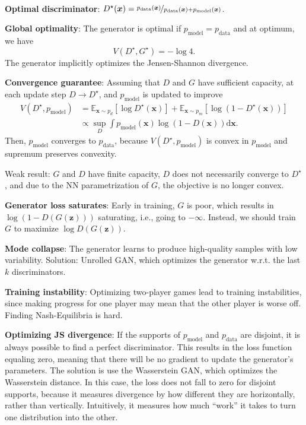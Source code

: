\documentclass{article}
\newcommand{\E}{\mathbb{E}}
\renewcommand{\vec}[1]{\bm{#1}}
\newenvironment{topic}[1]
{\textbf{\sffamily \colorbox{black}{\rlap{\textbf{\textcolor{white}{#1}}}\hspace{\linewidth}\hspace{-2\fboxsep}}} \\ \vspace{0.2cm}}
{}
\begin{document}
\begin{multicols*}{2}
\begin{topic}{Generative adversarial network}
        \textbf{Optimal discriminator}: $D^\star(\vec{x}) = \nicefrac{p_{\mathrm{data}}(\vec{x})}{p_{\mathrm{data}}(\vec{x}) + p_{\mathrm{model}}(\vec{x})}$.

        \textbf{Global optimality}: The generator is optimal if $p_{\mathrm{model}} = p_{\mathrm{data}}$ and at optimum, we have \[
            V(D^\star, G^\star) = -\log 4.
        \]
        The generator implicitly optimizes the Jensen-Shannon divergence.

        \textbf{Convergence guarantee}: Assuming that $D$ and $G$ have sufficient capacity, at each update step $D \to D^\star$, and $p_{\mathrm{model}}$ is updated to improve
        \begin{align*}
            V(D^\star, p_{\mathrm{model}}) & = \E_{\vec{x} \sim p_d} [\log D^\star(\vec{x})] + \E_{\vec{x} \sim p_m} [\log (1 - D^\star(\vec{x}))] \\
                                           & \propto \sup_D \int p_{\mathrm{model}}(\vec{x}) \log (1 - D(\vec{x})) \mathrm{d}\vec{x}.
        \end{align*}
        Then, $p_{\mathrm{model}}$ converges to $p_{\mathrm{data}}$, because $V(D^\star,
            p_{\mathrm{model}})$ is convex in $p_{\mathrm{model}}$ and supremum preserves convexity.

        Weak result: $G$ and $D$ have finite capacity, $D$ does not necessarily converge to $D^\star$, and
        due to the NN parametrization of $G$, the objective is no longer convex.

        \textbf{Generator loss saturates}: Early in training, $G$ is poor, which results in $\log (1
            - D(G(\vec{z})))$ saturating, i.e., going to $-\infty$. Instead, we should train $G$ to
        maximize $\log D(G(\vec{z}))$.

        \textbf{Mode collapse}: The generator learns to produce high-quality samples with low
        variability. Solution: Unrolled GAN, which optimizes the generator w.r.t. the last $k$
        discriminators.

        \textbf{Training instability}: Optimizing two-player games lead to training instabilities,
        since making progress for one player may mean that the other player is worse off. Finding
        Nash-Equilibria is hard.

        \textbf{Optimizing JS divergence}: If the supports of
        $p_{\mathrm{model}}$ and $p_{\mathrm{data}}$ are disjoint, it is always possible to find a
        perfect discriminator. This results in the loss function equaling zero, meaning that there
        will be no gradient to update the generator's parameters. The solution is use the Wasserstein
        GAN, which optimizes the Wasserstein distance. In this case, the loss does not fall to zero
        for disjoint supports, because it measures divergence by how different they are horizontally,
        rather than vertically. Intuitively, it measures how much “work” it takes to turn one
        distribution into the other.


\end{topic}
\end{multicols*}
\end{document}

